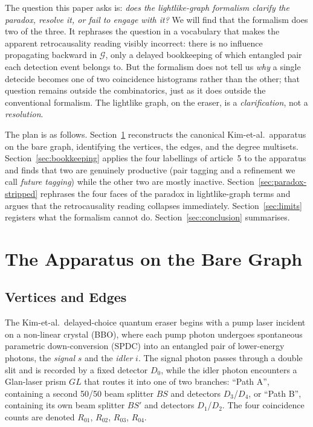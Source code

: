 \documentclass[11pt]{article}
\begin{document}
The question this paper asks is: \emph{does the lightlike-graph formalism clarify the paradox, resolve it, or fail to engage with it?} We will find that the formalism does two of the three. It rephrases the question in a vocabulary that makes the apparent retrocausality reading visibly incorrect: there is no influence propagating backward in $\mathcal{G}$, only a delayed bookkeeping of which entangled pair each detection event belongs to. But the formalism does not tell us \emph{why} a single detecide becomes one of two coincidence histograms rather than the other; that question remains outside the combinatorics, just as it does outside the conventional formalism. The lightlike graph, on the eraser, is a \emph{clarification}, not a \emph{resolution}.

The plan is as follows. Section~\ref{sec:apparatus} reconstructs the canonical Kim-et-al.~apparatus on the bare graph, identifying the vertices, the edges, and the degree multisets. Section~\ref{sec:bookkeeping} applies the four labellings of article~5 to the apparatus and finds that two are genuinely productive (pair tagging and a refinement we call \emph{future tagging}) while the other two are mostly inactive. Section~\ref{sec:paradox-stripped} rephrases the four faces of the paradox in lightlike-graph terms and argues that the retrocausality reading collapses immediately. Section~\ref{sec:limits} registers what the formalism cannot do. Section~\ref{sec:conclusion} summarises.

\section{The Apparatus on the Bare Graph}
\label{sec:apparatus}

\subsection{Vertices and Edges}

The Kim-et-al.~delayed-choice quantum eraser begins with a pump laser incident on a non-linear crystal (BBO), where each pump photon undergoes spontaneous parametric down-conversion (SPDC) into an entangled pair of lower-energy photons, the \emph{signal} $s$ and the \emph{idler} $i$. The signal photon passes through a double slit and is recorded by a fixed detector $D_0$, while the idler photon encounters a Glan-laser prism $GL$ that routes it into one of two branches: ``Path A'', containing a second 50/50 beam splitter $BS$ and detectors $D_3$/$D_4$, or ``Path B'', containing its own beam splitter $BS'$ and detectors $D_1$/$D_2$. The four coincidence counts are denoted $R_{01}$, $R_{02}$, $R_{03}$, $R_{04}$.
\end{document}
